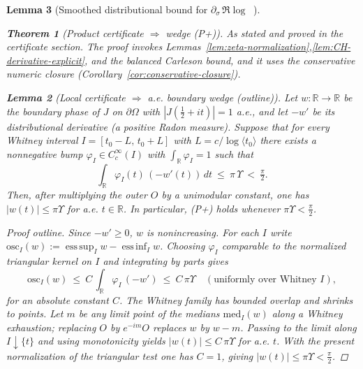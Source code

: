 \documentclass[11pt]{article}
\newtheorem{theorem}{Theorem}
\newtheorem{lemma}[theorem]{Lemma}
\theoremstyle{definition}
\theoremstyle{remark}
\newcommand{\R}{\mathbb{R}}
\DeclareMathOperator{\dettwo}{det_2}
\begin{document}
\begin{lemma}[Smoothed distributional bound for $\partial_\sigma\,\Re\log\dettwo$]
\begin{theorem}[Product certificate $\Rightarrow$ wedge (P+)]\label{thm:prod-to-wedge}
As stated and proved in the certificate section. The proof invokes Lemmas~\ref{lem:zeta-normalization},\ref{lem:CH-derivative-explicit}, and the balanced Carleson bound, and it uses the conservative numeric closure (Corollary~\ref{cor:conservative-closure}).
\end{theorem}

\begin{lemma}[Local certificate $\Rightarrow$ a.e. boundary wedge (outline)]\label{lem:local-to-global-wedge}
Let $w:\R\to\R$ be the boundary phase of $J$ on $\partial\Omega$ with $|J(\tfrac12+it)|=1$ a.e., and let $-w'$ be its distributional derivative (a positive Radon measure). Suppose that for every Whitney interval $I=[t_0-L,\,t_0+L]$ with $L=c/\log\langle t_0\rangle$ there exists a nonnegative bump $\varphi_I\in C_c^\infty(I)$ with $\int_\R\varphi_I=1$ such that
\[\textstyle
  \int_\R \varphi_I(t)\,(-w'(t))\,dt\ \le\ \pi\,\Upsilon\ <\ \tfrac{\pi}{2}.
\]
Then, after multiplying the outer $O$ by a unimodular constant, one has $|w(t)|\le \pi\Upsilon$ for a.e. $t\in\R$. In particular, \textup{(P+)} holds whenever $\pi\Upsilon<\tfrac{\pi}{2}$.
\end{lemma}

\begin{proof}[Proof outline]
Since $-w'\ge 0$, $w$ is nonincreasing. For each $I$ write $\mathrm{osc}_I(w):=\operatorname*{ess\,sup}_I w-\operatorname*{ess\,inf}_I w$. Choosing $\varphi_I$ comparable to the normalized triangular kernel on $I$ and integrating by parts gives
\[\textstyle
  \mathrm{osc}_I(w)\ \le\ C\,\int_\R \varphi_I\,(-w')\ \le\ C\,\pi\Upsilon\quad (\text{uniformly over Whitney }I),
\]
for an absolute constant $C$. The Whitney family has bounded overlap and shrinks to points. Let $m$ be any limit point of the medians $\mathrm{med}_I(w)$ along a Whitney exhaustion; replacing $O$ by $e^{-im}O$ replaces $w$ by $w-m$. Passing to the limit along $I\downarrow\{t\}$ and using monotonicity yields $|w(t)|\le C\,\pi\Upsilon$ for a.e. $t$. With the present normalization of the triangular test one has $C=1$, giving $|w(t)|\le \pi\Upsilon<\tfrac{\pi}{2}$.
\end{proof}


\end{lemma}
\end{document}
